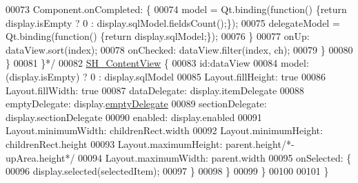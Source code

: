 \begin{DoxyCode}
00073 \textcolor{comment}{                    Component.onCompleted: \{}
00074 \textcolor{comment}{                        model = Qt.binding(function() \{return display.isEmpty ? 0 :
       display.sqlModel.fieldsCount();\});}
00075 \textcolor{comment}{                        delegateModel = Qt.binding(function() \{return display.sqlModel;\});}
00076 \textcolor{comment}{                    \}}
00077 \textcolor{comment}{                    onUp: dataView.sort(index);}
00078 \textcolor{comment}{                    onChecked: dataView.filter(index, ch);}
00079 \textcolor{comment}{                \}}
00080 \textcolor{comment}{            \}}
00081 \textcolor{comment}{        \}*/}
00082         \hyperlink{classSH__ContentView}{SH\_ContentView} \{
00083             \textcolor{keywordtype}{id}:dataView
00084             model: (display.isEmpty) ? 0 : display.sqlModel
00085             Layout.fillHeight: \textcolor{keyword}{true}
00086             Layout.fillWidth: \textcolor{keyword}{true}
00087             dataDelegate: display.itemDelegate
00088             emptyDelegate:  display.\hyperlink{classSH__ContentView_a243657fbb9155fd4af8e14c225795aa8}{emptyDelegate}
00089             sectionDelegate:  display.sectionDelegate
00090             enabled: display.enabled
00091             Layout.minimumWidth: childrenRect.width
00092             Layout.minimumHeight: childrenRect.height
00093             Layout.maximumHeight: parent.height\textcolor{comment}{/*-upArea.height*/}
00094             Layout.maximumWidth: parent.width
00095             onSelected: \{
00096                 display.selected(selectedItem);
00097             \}
00098         \}
00099     \}
00100 
00101 \}
\end{DoxyCode}
